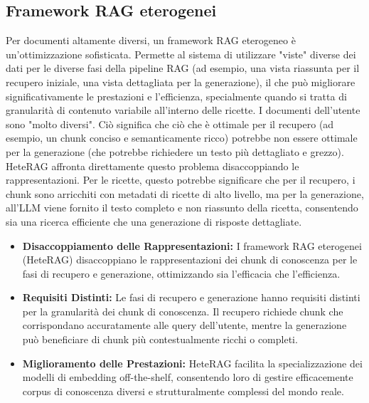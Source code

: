 \documentclass[a4paper, 11pt]{article}
\begin{document}
\subsection{Framework RAG eterogenei}
Per documenti altamente diversi, un framework RAG eterogeneo è un'ottimizzazione sofisticata. Permette al sistema di utilizzare "viste" diverse dei dati per le diverse fasi della pipeline RAG (ad esempio, una vista riassunta per il recupero iniziale, una vista dettagliata per la generazione), il che può migliorare significativamente le prestazioni e l'efficienza, specialmente quando si tratta di granularità di contenuto variabile all'interno delle ricette. I documenti dell'utente sono "molto diversi". Ciò significa che ciò che è ottimale per il recupero (ad esempio, un chunk conciso e semanticamente ricco) potrebbe non essere ottimale per la generazione (che potrebbe richiedere un testo più dettagliato e grezzo). HeteRAG \cite{heterag} affronta direttamente questo problema disaccoppiando le rappresentazioni. Per le ricette, questo potrebbe significare che per il recupero, i chunk sono arricchiti con metadati di ricette di alto livello, ma per la generazione, all'LLM viene fornito il testo completo e non riassunto della ricetta, consentendo sia una ricerca efficiente che una generazione di risposte dettagliate.
\begin{itemize}
    \item \textbf{Disaccoppiamento delle Rappresentazioni:} I framework RAG eterogenei (HeteRAG) disaccoppiano le rappresentazioni dei chunk di conoscenza per le fasi di recupero e generazione, ottimizzando sia l'efficacia che l'efficienza. \cite{heterag}
    \item \textbf{Requisiti Distinti:} Le fasi di recupero e generazione hanno requisiti distinti per la granularità dei chunk di conoscenza. Il recupero richiede chunk che corrispondano accuratamente alle query dell'utente, mentre la generazione può beneficiare di chunk più contestualmente ricchi o completi. \cite{heterag}
    \item \textbf{Miglioramento delle Prestazioni:} HeteRAG facilita la specializzazione dei modelli di embedding off-the-shelf, consentendo loro di gestire efficacemente corpus di conoscenza diversi e strutturalmente complessi del mondo reale. \cite{heterag}
\end{itemize}
\end{document}
